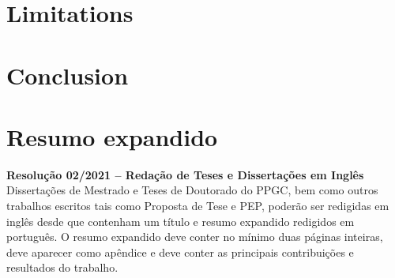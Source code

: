 \documentclass[ppgc,diss,english]{iiufrgs}
\begin{document}
\chapter{Limitations}

\chapter{Conclusion}




\appendix

\chapter{Resumo expandido}

\noindent
\textbf{Resolução 02/2021 -- Redação de Teses e Dissertações em Inglês}
Dissertações de Mestrado e Teses de Doutorado do PPGC, bem como outros
trabalhos escritos tais como Proposta de Tese e PEP, poderão ser
redigidas em inglês desde que contenham um título e resumo expandido
redigidos em português. O resumo expandido deve conter no mínimo duas
páginas inteiras, deve aparecer como apêndice e deve conter as
principais contribuições e resultados do trabalho.
\end{document}
